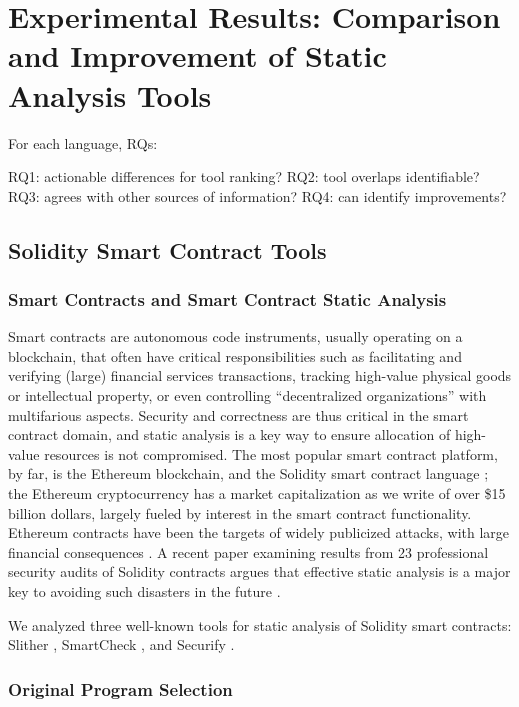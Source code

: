 \section{Experimental Results: Comparison and Improvement of Static Analysis Tools}

For each language, RQs:

RQ1:  actionable differences for tool ranking?
RQ2:  tool overlaps identifiable?
RQ3:  agrees with other sources of information?
RQ4:  can identify improvements?

\subsection{Solidity Smart Contract Tools}

\subsubsection{Smart Contracts and Smart Contract Static Analysis}

Smart contracts are autonomous code instruments, usually operating on a blockchain, that often have critical responsibilities such as facilitating and verifying (large) financial services transactions, tracking high-value physical goods or intellectual property, or even controlling ``decentralized organizations'' with multifarious aspects.  Security and correctness are thus critical in the smart contract domain, and static analysis is a key way to ensure allocation of high-value resources is not compromised.  The most popular smart contract platform, by far, is the Ethereum blockchain, and the Solidity smart contract language \cite{buterin2013whitepaper,wood2014yellow}; the Ethereum cryptocurrency has a market capitalization as we write of over \$15 billion dollars, largely fueled by interest in the smart contract functionality.  Ethereum contracts have been the targets of widely publicized attacks, with large financial consequences  \cite{spank,DAO}.   A recent paper examining results from 23 professional security audits of Solidity contracts argues that effective static analysis is a major key to avoiding such disasters in the future \cite{FC20}.

We analyzed three well-known tools for static analysis of Solidity smart contracts: Slither \cite{slither}, SmartCheck \cite{smartcheck}, and Securify \cite{Securify}.

\subsubsection{Original Program Selection}

